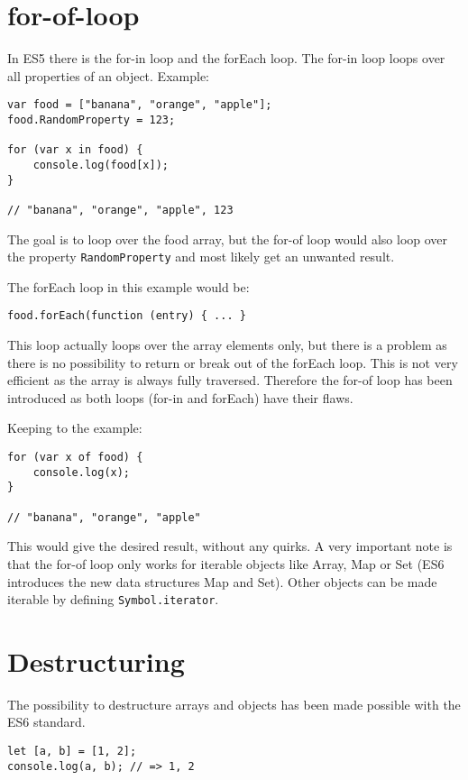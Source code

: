 \documentclass{bioinfo}
\begin{document}
\section{for-of-loop}
In ES5 there is the for-in loop and the forEach loop.
The for-in loop loops over all properties of an object. Example:

\begin{lstlisting}
var food = ["banana", "orange", "apple"];
food.RandomProperty = 123;

for (var x in food) {
    console.log(food[x]);
}

// "banana", "orange", "apple", 123
\end{lstlisting}

The goal is to loop over the food array, but the for-of loop would
also loop over the property {\tt RandomProperty} and most likely
get an unwanted result.

The forEach loop in this example would be:
\begin{lstlisting}
food.forEach(function (entry) { ... }
\end{lstlisting}
This loop actually loops over the array elements only, but there is a problem
as there is no possibility to return or break out of the forEach loop.
This is not very efficient as the array is always fully traversed.
Therefore the for-of loop has been introduced
as both loops (for-in and forEach) have their flaws.

Keeping to the example:
\begin{lstlisting}
for (var x of food) {
    console.log(x);
}

// "banana", "orange", "apple"
\end{lstlisting}

This would give the desired result, without any quirks. A very important note is
that the for-of loop only works for iterable objects like Array, Map or Set
(ES6 introduces the new data structures Map and Set). Other objects can be made
iterable by defining {\tt Symbol.iterator}.

\section{Destructuring}
The possibility to destructure arrays and objects has been made possible with
the ES6 standard.

\begin{lstlisting}
let [a, b] = [1, 2];
console.log(a, b); // => 1, 2
\end{lstlisting}
\end{document}
